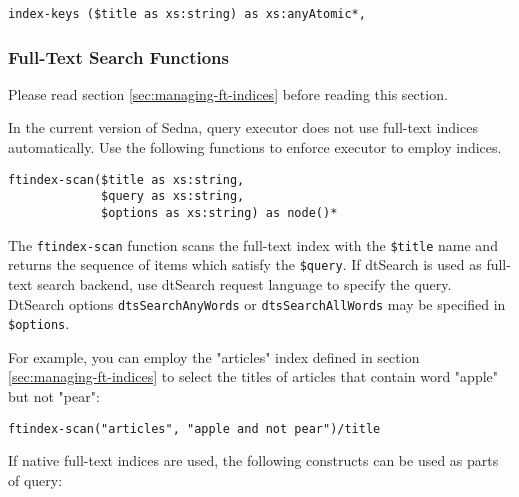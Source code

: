 \documentclass[a4paper,12pt]{article}
\begin{document}
\begin{verbatim}
index-keys ($title as xs:string) as xs:anyAtomic*,
\end{verbatim}


\subsubsection{Full-Text Search Functions}
\label{sec:ft-fun}

Please read section \ref{sec:managing-ft-indices} before reading this section.

In the current version of Sedna, query executor does not use full-text indices
automatically. Use the following functions to enforce executor to employ
indices.

\begin{verbatim}
ftindex-scan($title as xs:string,
             $query as xs:string,
             $options as xs:string) as node()*
\end{verbatim}

The \verb!ftindex-scan! function scans the full-text index with the
\verb!$title! name and returns the sequence of items which satisfy the
\verb!$query!. If dtSearch \cite{link:dtsearch-engine} is used as full-text
search backend, use dtSearch request language \cite{doc:dtsearch} to specify the
query. DtSearch options \verb!dtsSearchAnyWords! or \verb!dtsSearchAllWords! may
be specified in \verb!$options!.

For example, you can employ the "articles" index defined in section
\ref{sec:managing-ft-indices} to select the titles of articles that contain word
"apple" but not "pear":

\begin{verbatim}
ftindex-scan("articles", "apple and not pear")/title
\end{verbatim}

If native full-text indices are used, the following constructs can be used as
parts of query:
\end{document}

